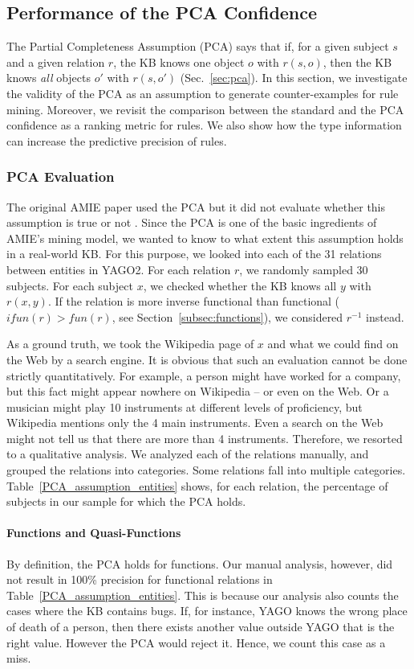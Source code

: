 \subsection{Performance of the PCA Confidence} \label{experimentspca}
The Partial Completeness Assumption (PCA) says that if, for a given subject $s$ and a given relation $r$, the KB knows one object $o$ with $r(s,o)$, then the KB knows \emph{all} objects $o'$ with $r(s,o')$ (Sec.~\ref{sec:pca}). In this section, we investigate the validity of the PCA as an assumption to generate counter-examples
for rule mining. Moreover, we revisit the comparison between the standard and the PCA confidence
as a ranking metric for rules. We also show how the type information can increase the predictive precision of rules.

\subsubsection{PCA Evaluation}\label{pcaEvaluation}
The original AMIE paper used the PCA but it did not evaluate whether this assumption is true or not \cite{amie}.
Since the PCA is one of the basic ingredients of AMIE's mining model,
we wanted to know to what extent this assumption holds in a real-world KB.
For this purpose, we looked into each of the 31 relations between entities in YAGO2.
For each relation $r$, we randomly sampled 30 subjects.
For each subject $x$, we checked whether the KB knows all $y$ with $r(x,y)$. If the relation is more inverse functional than functional
($ifun(r) > fun(r)$, see Section~\ref{subsec:functions}), we considered $r^{-1}$ instead.

As a ground truth, we took the Wikipedia page of $x$ and what we could find on the Web by a search engine.
It is obvious that such an evaluation cannot be done strictly quantitatively.
For example, a person might have worked for a company, but this fact might appear nowhere on Wikipedia -- or even on the Web.
Or a musician might play 10 instruments at different levels of proficiency, but Wikipedia mentions only the 4 main instruments.
Even a search on the Web might not tell us that there are more than 4 instruments.
Therefore, we resorted to a qualitative analysis.
We analyzed each of the relations manually, and grouped the relations into categories.
Some relations fall into multiple categories.
Table~\ref{PCA_assumption_entities} shows, for each relation, the percentage of subjects in our sample for which the PCA holds.

\paragraph{Functions and Quasi-Functions} By definition, the PCA holds for functions. Our manual analysis, however, did not result in 100\% precision for functional relations in Table~\ref{PCA_assumption_entities}.
This is because our analysis also counts the cases where the KB contains bugs. If, for instance, YAGO knows the wrong place of death of a person, then there exists another value outside YAGO that is the right value. However the PCA would reject it. Hence, we count this case as a miss.

